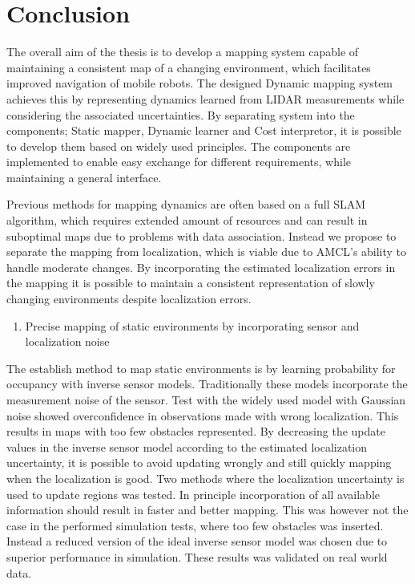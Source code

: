 \section{Conclusion}
The overall aim of the thesis is to develop a mapping system capable of maintaining a consistent map of a changing environment, which facilitates improved navigation of mobile robots.
The designed Dynamic mapping system achieves this by representing dynamics learned from LIDAR measurements while considering the associated uncertainties.
By separating system into the components; Static mapper, Dynamic learner and Cost interpretor, it is possible to develop them based on widely used principles. 
The components are implemented to enable easy exchange for different requirements, while maintaining a general interface.

Previous methods for mapping dynamics are often based on a full SLAM algorithm, which requires extended amount of resources and can result in suboptimal maps due to problems with data association.
Instead we propose to separate the mapping from localization, which is viable due to AMCL's ability to handle moderate changes. 
By incorporating the estimated localization errors in the mapping it is possible to maintain a consistent representation of slowly changing environments despite localization errors.

\begin{enumerate}
    \setcounter{enumi}{0}
    \item Precise mapping of static environments by incorporating sensor and localization noise
\end{enumerate}

The establish method to map static environments is by learning probability for occupancy with inverse sensor models.
Traditionally these models incorporate the measurement noise of the sensor.
Test with the widely used model with Gaussian noise showed overconfidence in observations made with wrong localization. 
This results in maps with too few obstacles represented.
By decreasing the update values in the inverse sensor model according to the estimated localization uncertainty, it is possible to avoid updating wrongly and still quickly mapping when the localization is good.
Two methods where the localization uncertainty is used to update regions was tested.
In principle incorporation of all available information should result in faster and better mapping. 
This was however not the case in the performed simulation tests, where too few obstacles was inserted.
Instead a reduced version of the ideal inverse sensor model was chosen due to superior performance in simulation.
These results was validated on real world data.

